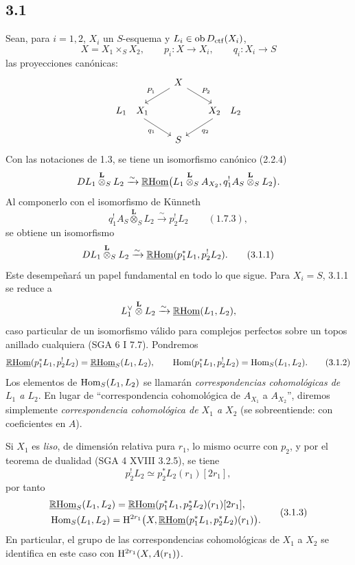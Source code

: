 \subsection*{3.1}
Sean, para $i=1,2$, $X_i$ un $S$-esquema y $L_i\in\operatorname{ob}D_{\mathrm{ctf}}(X_i)$,
\[
X=X_1\times_S X_2,
\qquad
p_i:X\longrightarrow X_i,
\qquad
q_i:X_i\longrightarrow S
\]
las proyecciones canónicas:
\[
\begin{tikzcd}[column sep=1.8em,row sep=1.5em]
& X \arrow[dl,"P_1"'] \arrow[dr,"P_2"] & \\
L_1\quad X_1 \arrow[dr,"q_1"'] & & X_2\quad L_2 \arrow[dl,"q_2"] \\
& S &
\end{tikzcd}
\]
Con las notaciones de 1.3, se tiene un isomorfismo canónico (2.2.4)
\[
DL_1\overset{\mathbf L}{\otimes}_S L_2
\xrightarrow{\sim}
\underline{\mathbb{R}\mathrm{Hom}}\bigl(L_1\overset{\mathbf L}{\otimes}_S A_{X_2},
q_1^!A_S\overset{\mathbf L}{\otimes}_S L_2\bigr).
\]
Al componerlo con el isomorfismo de Künneth
\[
q_1^!A_S\overset{\mathbf L}{\otimes}_S L_2
\xrightarrow{\sim}p_2^!L_2 \qquad (1.7.3),
\]
se obtiene un isomorfismo
\begin{equation}
DL_1\overset{\mathbf L}{\otimes}_S L_2
\xrightarrow{\sim}
\underline{\mathbb{R}\mathrm{Hom}}(p_1^*L_1,p_2^!L_2).
\tag{3.1.1}
\end{equation}
Este desempeñará un papel fundamental en todo lo que sigue. Para $X_i=S$, 3.1.1 se reduce a
\[
L_1^\vee\overset{\mathbf L}{\otimes}L_2\xrightarrow{\sim}\underline{\mathbb{R}\mathrm{Hom}}(L_1,L_2),
\]
caso particular de un isomorfismo válido para complejos perfectos sobre un topos anillado cualquiera (SGA 6 I 7.7). Pondremos
\begin{equation}
\underline{\mathbb{R}\mathrm{Hom}}(p_1^*L_1,p_2^!L_2)=\underline{\mathbb{R}\mathrm{Hom}}_S(L_1,L_2),
\qquad
\operatorname{Hom}(p_1^*L_1,p_2^!L_2)=\operatorname{Hom}_S(L_1,L_2).
\tag{3.1.2}
\end{equation}
Los elementos de $\operatorname{Hom}_S(L_1,L_2)$ se llamarán \emph{correspondencias cohomológicas de $L_1$ a $L_2$}. En lugar de ``correspondencia cohomológica de $A_{X_1}$ a $A_{X_2}$'', diremos simplemente \emph{correspondencia cohomológica de $X_1$ a $X_2$} (se sobreentiende: con coeficientes en $A$).

Si $X_1$ es \emph{liso}, de dimensión relativa pura $r_1$, lo mismo ocurre con $p_2$, y por el teorema de dualidad (SGA 4 XVIII 3.2.5), se tiene
\[
p_2^!L_2\simeq p_2^*L_2(r_1)[2r_1],
\]
por tanto
\begin{equation}
\begin{aligned}
&\underline{\mathbb{R}\mathrm{Hom}}_S(L_1,L_2)=\underline{\mathbb{R}\mathrm{Hom}}(p_1^*L_1,p_2^*L_2)(r_1)[2r_1],\\
&\operatorname{Hom}_S(L_1,L_2)=\mathrm{H}^{2r_1}\bigl(X,\underline{\mathbb{R}\mathrm{Hom}}(p_1^*L_1,p_2^*L_2)(r_1)\bigr).
\end{aligned}
\tag{3.1.3}
\end{equation}
En particular, el grupo de las correspondencias cohomológicas de $X_1$ a $X_2$ se identifica en este caso con $\mathrm{H}^{2r_1}(X,A(r_1))$.

